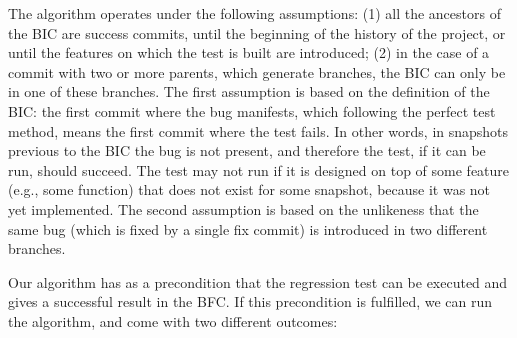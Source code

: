 The algorithm operates under the following assumptions: (1) all the ancestors of the BIC are success commits, until the beginning of the history of the project, or until the features on which the test is built are introduced; (2) in the case of a commit with two or more parents, which generate branches, the BIC can only be in one of these branches.
The first assumption is based on the definition of the BIC: the first commit where the bug manifests, which following the perfect test method, means the first commit where the test fails. In other words, in snapshots previous to the BIC the bug is not present, and therefore the test, if it can be run, should succeed. The test may not run if it is designed on top of some feature (e.g., some function) that does not exist for some snapshot, because it was not yet implemented.
The second assumption is based on the unlikeness that the same bug (which is fixed by a single fix commit) is introduced in two different branches. 

Our algorithm has as a precondition that the regression test can be executed and gives a successful result in the BFC.
If this precondition is fulfilled, we can run the algorithm, and come with two different outcomes:

